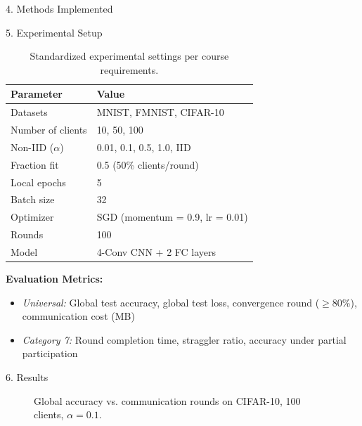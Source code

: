 \documentclass[final]{beamer}
\newlength{\colwidth}
\begin{document}
\begin{frame}[t]
\begin{columns}[t]
\begin{column}{\colwidth}
\begin{block}{4. Methods Implemented}
  \end{block}

  \begin{block}{5. Experimental Setup}

    \begin{table}
      \centering
      \begin{tabular}{l l}
        \toprule
        \textbf{Parameter} & \textbf{Value} \\
        \midrule
        Datasets & MNIST, FMNIST, CIFAR-10 \\
        Number of clients & 10, 50, 100 \\
        Non-IID ($\alpha$) & 0.01, 0.1, 0.5, 1.0, IID \\
        Fraction fit & 0.5 (50\% clients/round) \\
        Local epochs & 5 \\
        Batch size & 32 \\
        Optimizer & SGD (momentum = 0.9, lr = 0.01) \\
        Rounds & 100 \\
        Model & 4-Conv CNN + 2 FC layers \\
        \bottomrule
      \end{tabular}
      \caption{Standardized experimental settings per course requirements.}
    \end{table}

    \textbf{Evaluation Metrics:}
    \begin{itemize}
      \item \textit{Universal:} Global test accuracy, global test loss, convergence round ($\geq$80\%), communication cost (MB)
      \item \textit{Category 7:} Round completion time, straggler ratio, accuracy under partial participation
    \end{itemize}

  \end{block}

  \begin{block}{6. Results}

    \begin{figure}
      \centering
      \caption{Global accuracy vs. communication rounds on CIFAR-10, 100 clients, $\alpha=0.1$.}
    \end{figure}


\end{block}
\end{column}
\end{columns}
\end{frame}
\end{document}

